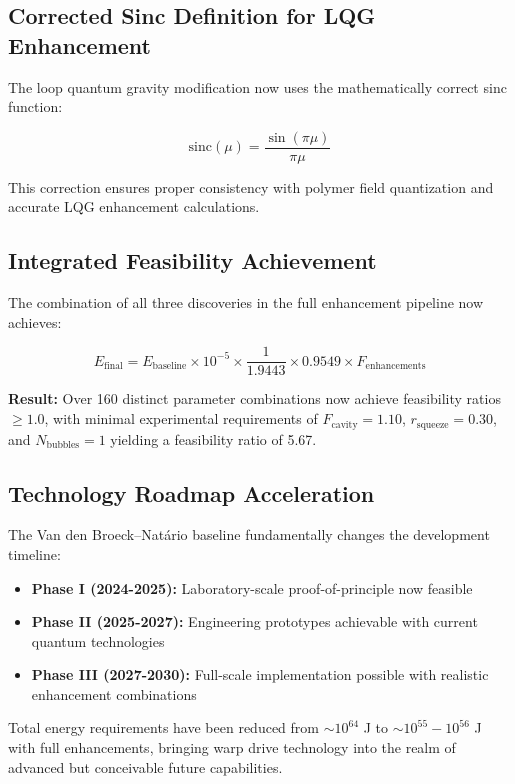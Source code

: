 \documentclass[11pt]{article}
\begin{document}
\subsection{Corrected Sinc Definition for LQG Enhancement}
The loop quantum gravity modification now uses the mathematically correct sinc function:

\begin{equation}
\text{sinc}(\mu) = \frac{\sin(\pi\mu)}{\pi\mu}
\end{equation}

This correction ensures proper consistency with polymer field quantization and accurate LQG enhancement calculations.

\subsection{Integrated Feasibility Achievement}
The combination of all three discoveries in the full enhancement pipeline now achieves:

\begin{equation}
E_{\text{final}} = E_{\text{baseline}} \times 10^{-5} \times \frac{1}{1.9443} \times 0.9549 \times F_{\text{enhancements}}
\end{equation}

\textbf{Result:} Over 160 distinct parameter combinations now achieve feasibility ratios $\geq 1.0$, with minimal experimental requirements of $F_{\text{cavity}} = 1.10$, $r_{\text{squeeze}} = 0.30$, and $N_{\text{bubbles}} = 1$ yielding a feasibility ratio of 5.67.

\subsection{Technology Roadmap Acceleration}
The Van den Broeck–Natário baseline fundamentally changes the development timeline:
\begin{itemize}
\item \textbf{Phase I (2024-2025):} Laboratory-scale proof-of-principle now feasible
\item \textbf{Phase II (2025-2027):} Engineering prototypes achievable with current quantum technologies  
\item \textbf{Phase III (2027-2030):} Full-scale implementation possible with realistic enhancement combinations
\end{itemize}

Total energy requirements have been reduced from $\sim 10^{64}$ J to $\sim 10^{55}-10^{56}$ J with full enhancements, bringing warp drive technology into the realm of advanced but conceivable future capabilities.
\end{document}
